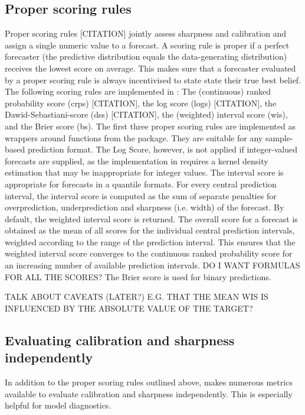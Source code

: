 \documentclass[article]{jss}
\begin{document}
\subsection{Proper scoring rules}

Proper scoring rules [CITATION] jointly assess sharpness and calibration and assign a single numeric value to a forecast. A scoring rule is proper if a perfect forecaster (the predictive distribution equals the data-generating distribution) receives the lowest score on average. This makes sure that a forecaster evaluated by a proper scoring rule is always incentivised to state state their true best belief. The following scoring rules are implemented in : The (continuous) ranked probability score (crps) [CITATION], the log score (logs) [CITATION], the Dawid-Sebastiani-score (dss) [CITATION], the (weighted) interval score (wis), and the Brier score (bs). The first three proper scoring rules are implemented as wrappers around functions from the  package. They are suitable for any sample-based prediction format. The Log Score, however, is not applied if integer-valued forecasts are supplied, as the implementation in  requires a kernel density estimation that may be inappropriate for integer values. The interval score is appropriate for forecasts in a quantile formats. For every central prediction interval, the interval score is computed as the sum of separate penalties for overprediction, underprediction and sharpness (i.e. width) of the forecast. By default, the weighted interval score is returned. The overall score for a forecast is obtained as the mean of all scores for the individual central prediction intervals, weighted according to the range of the prediction interval. This ensures that the weighted interval score converges to the continuous ranked probability score for an increasing number of available prediction intervals. 
DO I WANT FORMULAS FOR ALL THE SCORES? The Brier score is used for binary predictions. 

TALK ABOUT CAVEATS (LATER?) E.G. THAT THE MEAN WIS IS INFLUENCED BY THE ABSOLUTE VALUE OF THE TARGET?

\subsection{Evaluating calibration and sharpness independently}

In addition to the proper scoring rules outlined above,  makes numerous metrics available to evaluate calibration and sharpness independently. This is especially helpful for model diagnostics. 
\end{document}
